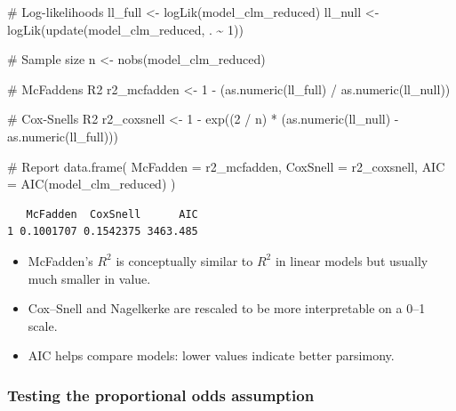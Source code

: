 \documentclass[
  letterpaper,
  DIV=11,
  numbers=noendperiod]{scrartcl}
\newenvironment{Shaded}{\begin{snugshade}}{\end{snugshade}}
\newcommand{\AttributeTok}[1]{\textcolor[rgb]{0.40,0.45,0.13}{#1}}
\newcommand{\CommentTok}[1]{\textcolor[rgb]{0.37,0.37,0.37}{#1}}
\newcommand{\DecValTok}[1]{\textcolor[rgb]{0.68,0.00,0.00}{#1}}
\newcommand{\FunctionTok}[1]{\textcolor[rgb]{0.28,0.35,0.67}{#1}}
\newcommand{\NormalTok}[1]{\textcolor[rgb]{0.00,0.23,0.31}{#1}}
\newcommand{\OtherTok}[1]{\textcolor[rgb]{0.00,0.23,0.31}{#1}}
\newcommand{\SpecialCharTok}[1]{\textcolor[rgb]{0.37,0.37,0.37}{#1}}
\begin{document}
\begin{Shaded}
\begin{Highlighting}[]
\CommentTok{\# Log{-}likelihoods}
\NormalTok{ll\_full }\OtherTok{\textless{}{-}} \FunctionTok{logLik}\NormalTok{(model\_clm\_reduced)}
\NormalTok{ll\_null }\OtherTok{\textless{}{-}} \FunctionTok{logLik}\NormalTok{(}\FunctionTok{update}\NormalTok{(model\_clm\_reduced, . }\SpecialCharTok{\textasciitilde{}} \DecValTok{1}\NormalTok{))}

\CommentTok{\# Sample size}
\NormalTok{n }\OtherTok{\textless{}{-}} \FunctionTok{nobs}\NormalTok{(model\_clm\_reduced)}

\CommentTok{\# McFadden\textquotesingle{}s R2}
\NormalTok{r2\_mcfadden }\OtherTok{\textless{}{-}} \DecValTok{1} \SpecialCharTok{{-}}\NormalTok{ (}\FunctionTok{as.numeric}\NormalTok{(ll\_full) }\SpecialCharTok{/} \FunctionTok{as.numeric}\NormalTok{(ll\_null))}

\CommentTok{\# Cox{-}Snell\textquotesingle{}s R2}
\NormalTok{r2\_coxsnell }\OtherTok{\textless{}{-}} \DecValTok{1} \SpecialCharTok{{-}} \FunctionTok{exp}\NormalTok{((}\DecValTok{2} \SpecialCharTok{/}\NormalTok{ n) }\SpecialCharTok{*}\NormalTok{ (}\FunctionTok{as.numeric}\NormalTok{(ll\_null) }\SpecialCharTok{{-}} \FunctionTok{as.numeric}\NormalTok{(ll\_full)))}

\CommentTok{\# Report}
\FunctionTok{data.frame}\NormalTok{(}
  \AttributeTok{McFadden =}\NormalTok{ r2\_mcfadden,}
  \AttributeTok{CoxSnell =}\NormalTok{ r2\_coxsnell,}
  \AttributeTok{AIC =} \FunctionTok{AIC}\NormalTok{(model\_clm\_reduced)}
\NormalTok{)}
\end{Highlighting}
\end{Shaded}

\begin{verbatim}
   McFadden  CoxSnell      AIC
1 0.1001707 0.1542375 3463.485
\end{verbatim}

\begin{itemize}
\item
  McFadden's \(R^2\) is conceptually similar to \(R^2\) in linear models
  but usually much smaller in value.
\item
  Cox--Snell and Nagelkerke are rescaled to be more interpretable on a
  0--1 scale.
\item
  AIC helps compare models: lower values indicate better parsimony.
\end{itemize}

\hypertarget{testing-the-proportional-odds-assumption-1}{%
\subsubsection*{Testing the proportional odds
assumption}\label{testing-the-proportional-odds-assumption-1}}
\end{document}
